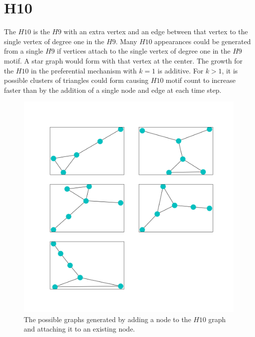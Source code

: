 \section{H10}
The $H10$ is the $H9$ with an extra vertex and an edge between that vertex to the 
single vertex of degree one in the $H9$. Many $H10$ appearances could be generated from a single $H9$ if vertices
attach to the single vertex of degree one in the $H9$ motif. A star graph would form
with that vertex at the center. The growth for the $H10$ in the preferential mechanism with $k=1$ is additive.
For $k>1$, it is possible clusters of triangles could form causing $H10$ motif count to increase faster than by the addition of a single node and edge at each time step. 

\begin{figure}[!ht]
    \includegraphics[width=12cm]{Images/H10_evolution.png}
    \centering
    \caption{The possible graphs generated by adding a node to the $H10$ graph 
    and attaching it to an existing node.}
\end{figure}

